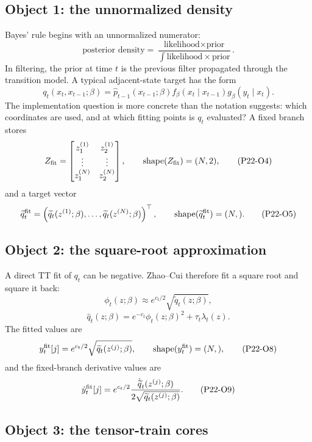 \documentclass[11pt]{article}
\newcommand{\shape}{\operatorname{shape}}
\begin{document}
\subsection*{Object 1: the unnormalized density}

Bayes' rule begins with an unnormalized numerator:
\[
    \text{posterior density}
    =
    \frac{\text{likelihood}\times\text{prior}}
    {\int \text{likelihood}\times\text{prior}}.
    \tag{P22-O2}
\]
In filtering, the prior at time \(t\) is the previous filter propagated through
the transition model.  A typical adjacent-state target has the form
\[
    q_t(x_t,x_{t-1};\beta)
    =
    \widehat p_{t-1}(x_{t-1};\beta)
    f_\beta(x_t\mid x_{t-1})
    g_\beta(y_t\mid x_t).
    \tag{P22-O3}
\]
The implementation question is more concrete than the notation suggests:
which coordinates are used, and at which fitting points is \(q_t\) evaluated?
A fixed branch stores
\[
    Z_{\rm fit}
    =
    \begin{bmatrix}
    z_1^{(1)} & z_2^{(1)}\\
    \vdots & \vdots\\
    z_1^{(N)} & z_2^{(N)}
    \end{bmatrix},
    \qquad
    \shape(Z_{\rm fit})=(N,2),
    \tag{P22-O4}
\]
and a target vector
\[
    \widetilde q_t^{\rm fit}
    =
    \left(
    \widetilde q_t(z^{(1)};\beta),\ldots,
    \widetilde q_t(z^{(N)};\beta)
    \right)^\top,
    \qquad
    \shape(\widetilde q_t^{\rm fit})=(N,).
    \tag{P22-O5}
\]

\subsection*{Object 2: the square-root approximation}

A direct TT fit of \(q_t\) can be negative.  Zhao--Cui therefore fit a square
root and square it back:
\[
    \phi_t(z;\beta)\approx e^{c_t/2}\sqrt{\widetilde q_t(z;\beta)},
    \tag{P22-O6}
\]
\[
    \widehat q_t(z;\beta)
    =
    e^{-c_t}\phi_t(z;\beta)^2+\tau_t\lambda_t(z).
    \tag{P22-O7}
\]
The fitted values are
\[
    y_t^{\rm fit}[j]
    =
    e^{c_t/2}\sqrt{\widetilde q_t(z^{(j)};\beta)},
    \qquad
    \shape(y_t^{\rm fit})=(N,),
    \tag{P22-O8}
\]
and the fixed-branch derivative values are
\[
    \dot y_t^{\rm fit}[j]
    =
    e^{c_t/2}
    \frac{\dot{\widetilde q}_t(z^{(j)};\beta)}
    {2\sqrt{\widetilde q_t(z^{(j)};\beta)}}.
    \tag{P22-O9}
\]

\subsection*{Object 3: the tensor-train cores}
\end{document}
